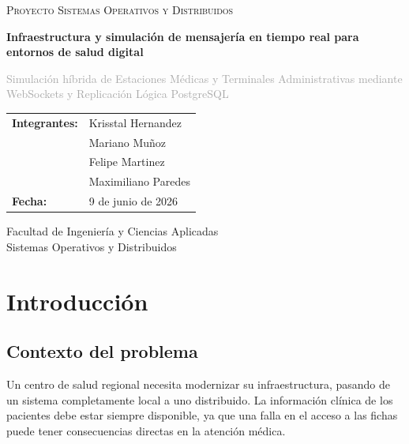 \documentclass[11pt,a4paper]{article}
\begin{document}
\begin{titlepage}
    \centering
    \vspace*{1.5cm}
    {\scshape\Large Proyecto Sistemas Operativos y Distribuidos \par}
    \vspace{1.5cm}
    {\huge\bfseries\color{navy} Infraestructura y simulación de mensajería en tiempo real para entornos de salud digital \par}
    \vspace{0.8cm}
    {\large\textcolor{darkgray}{Simulación híbrida de Estaciones Médicas y Terminales Administrativas mediante WebSockets y Replicación Lógica PostgreSQL} \par}
    \vspace{2.5cm}
    
    \begin{tabular}{p{4cm}l}
        \textbf{Integrantes:} & Krisstal Hernandez \\
                              & Mariano Muñoz \\
                              & Felipe Martinez \\
                              & Maximiliano Paredes \\[0.3cm]
        \textbf{Fecha:}       & 9 de junio de 2026
    \end{tabular}
    
    \vfill
    \begin{center}
        \small\sffamily\color{darkgray}
        Facultad de Ingeniería y Ciencias Aplicadas \\
        Sistemas Operativos y Distribuidos
    \end{center}
\end{titlepage}

\newpage
\tableofcontents
\newpage


\section{Introducción}

\subsection{Contexto del problema}
Un centro de salud regional necesita modernizar su infraestructura, pasando de un sistema completamente local a uno distribuido. La información clínica de los pacientes debe estar siempre disponible, ya que una falla en el acceso a las fichas puede tener consecuencias directas en la atención médica.
\end{document}
